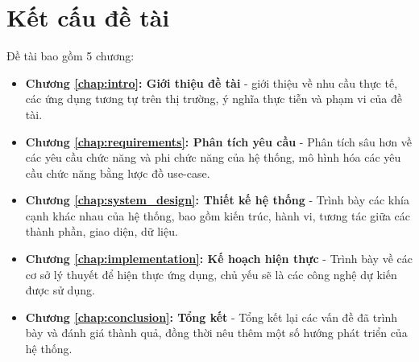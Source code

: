 \documentclass[../main.tex]{subfiles}
\begin{document}
	\section{Kết cấu đề tài}

	Đề tài bao gồm 5 chương:

	\begin{itemize}
		\item \textbf{Chương \ref{chap:intro}: Giới thiệu đề tài} - giới thiệu về nhu cầu thực tế, các ứng dụng tương tự
		trên thị trường, ý nghĩa thực tiễn và phạm vi của đề tài.
		\item \textbf{Chương \ref{chap:requirements}: Phân tích yêu cầu} - Phân tích sâu hơn về các yêu cầu chức năng và phi
		chức năng của hệ thống, mô hình hóa các yêu cầu chức năng bằng lược đồ use-case.
		\item \textbf{Chương \ref{chap:system_design}: Thiết kế hệ thống} - Trình bày các khía cạnh khác nhau của hệ thống,
		bao gồm kiến trúc, hành vi, tương tác giữa các thành phần, giao diện, dữ liệu.
		\item \textbf{Chương \ref{chap:implementation}: Kế hoạch hiện thực} - Trình bày về các cơ sở lý thuyết để hiện thực
		ứng dụng, chủ yếu sẽ là các công nghệ dự kiến được sử dụng.
		\item \textbf{Chương \ref{chap:conclusion}: Tổng kết} - Tổng kết lại các vấn đề đã trình bày và đánh giá thành quả,
		đồng thời nêu thêm một số hướng phát triển của hệ thống.

	\end{itemize}

	\newpage
\end{document}
